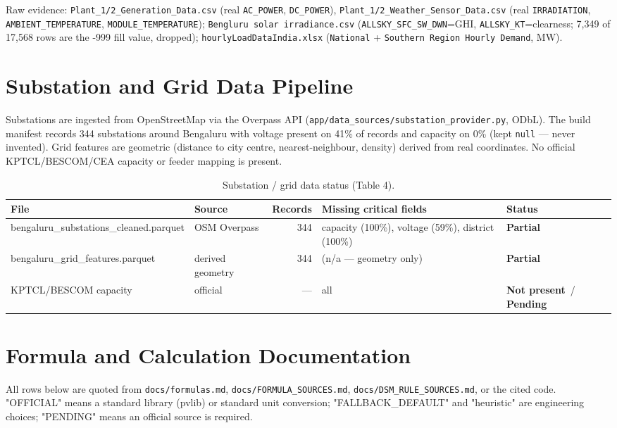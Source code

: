 \documentclass[11pt,a4paper]{article}
\newcommand{\stP}{\textcolor{cpart}{\textbf{Partial}}}
\newcommand{\stPend}{\textcolor{cpart}{\textbf{Pending}}}
\newcommand{\stNP}{\textcolor{cmiss}{\textbf{Not present}}}
\newcommand{\code}[1]{\texttt{\small #1}}
\begin{document}
\noindent Raw evidence: \code{Plant\_1/2\_Generation\_Data.csv} (real \code{AC\_POWER},
\code{DC\_POWER}), \code{Plant\_1/2\_Weather\_Sensor\_Data.csv} (real \code{IRRADIATION},
\code{AMBIENT\_TEMPERATURE}, \code{MODULE\_TEMPERATURE}); \code{Bengluru solar
irradiance.csv} (\code{ALLSKY\_SFC\_SW\_DWN}=GHI, \code{ALLSKY\_KT}=clearness; 7{,}349 of
17{,}568 rows are the -999 fill value, dropped); \code{hourlyLoadDataIndia.xlsx}
(\code{National} + \code{Southern Region Hourly Demand}, MW).

\section{Substation and Grid Data Pipeline}
Substations are ingested from OpenStreetMap via the Overpass API
(\code{app/data\_sources/substation\_provider.py}, ODbL). The build manifest records 344
substations around Bengaluru with voltage present on 41\% of records and capacity on 0\%
(kept \code{null} --- never invented). Grid features are geometric (distance to city
centre, nearest-neighbour, density) derived from real coordinates. No official
KPTCL/BESCOM/CEA capacity or feeder mapping is present.

\begin{table}[H]\centering\footnotesize
\caption{Substation / grid data status (Table 4).}\label{tab:subs}
\begin{tabular}{@{}p{3.4cm}p{2.0cm}r p{3.0cm}p{2.6cm}@{}}
\toprule
\textbf{File} & \textbf{Source} & \textbf{Records} & \textbf{Missing critical fields} & \textbf{Status}\\
\midrule
bengaluru\_substations\_cleaned.parquet & OSM Overpass & 344 & capacity (100\%), voltage (59\%), district (100\%) & \stP\\
bengaluru\_grid\_features.parquet & derived geometry & 344 & (n/a --- geometry only) & \stP\\
KPTCL/BESCOM capacity & official & --- & all & \stNP\ / \stPend\\
\bottomrule
\end{tabular}
\end{table}

\section{Formula and Calculation Documentation}
All rows below are quoted from \code{docs/formulas.md}, \code{docs/FORMULA\_SOURCES.md},
\code{docs/DSM\_RULE\_SOURCES.md}, or the cited code. "OFFICIAL" means a standard library
(pvlib) or standard unit conversion; "FALLBACK\_DEFAULT" and "heuristic" are engineering
choices; "PENDING" means an official source is required.
\end{document}
